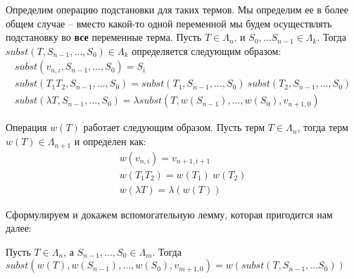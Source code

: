 Определим операцию подстановки для таких термов. Мы определим ее в более общем случае -- вместо какой-то одной переменной мы будем осуществлять подстановку во \textbf{все} переменные терма. Пусть $T \in \Lambda_{n}$, и $S_{0}, \dots S_{n-1} \in \Lambda_{k}$. Тогда $subst(T, S_{n - 1}, \dots, S_{0}) \in \Lambda_{k}$ определяется следующим образом:
\begin{gather*}
  subst(v_{n, i}, S_{n - 1}, \dots, S_{0}) = S_{i} \\
  subst(T_{1} T_{2}, S_{n - 1}, \dots, S_{0}) =  subst(T_{1}, S_{n - 1}, \dots, S_{0})\ subst(T_{2}, S_{n - 1}, \dots, S_{0}) \\
  subst(\lambda T, S_{n - 1}, \dots, S_{0}) = \lambda subst(T, w(S_{n - 1}), \dots, w(S_{0}), v_{n+1, 0})
\end{gather*}

Операция $w(T)$ работает следующим образом. Пусть терм $T \in \Lambda_{n}$, тогда терм $w(T) \in \Lambda_{n+1}$ и определен как:
\begin{gather*}
  w(v_{n, i}) = v_{n+1, i+1} \\
  w(T_{1} T_{2}) = w(T_1)\ w(T_2) \\
  w(\lambda T) = \lambda (w(T))
\end{gather*}

Сформулируем и докажем вспомогательную лемму, которая пригодится нам далее:
\begin{lemma}
  \label{index:weak_lemma}
  Пусть $T \in \Lambda_{n}$, а $S_{n-1}, \dots, S_{0} \in \Lambda_{m}$. Тогда $subst(w(T), w(S_{n-1}), \dots, w(S_{0}), v_{m+1, 0}) = w(subst(T, S_{n-1}, \dots S_{0}))$
\end{lemma}


